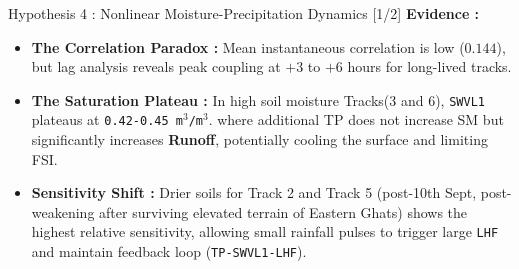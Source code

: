 \begin{frame}{Hypothesis 4 : Nonlinear Moisture-Precipitation Dynamics [1/2]}
	\vspace{0.2cm}
	\footnotesize
	\textbf{Evidence :}
	\begin{itemize}
		\item \textbf{The Correlation Paradox :} Mean instantaneous correlation is low ($0.144$), but lag analysis reveals peak coupling at $+3$ to $+6$ hours for long-lived tracks.
		\item \textbf{The Saturation Plateau :} In high soil moisture Tracks(3 and 6), \texttt{SWVL1} plateaus at \texttt{0.42-0.45 m$^3$/m$^3$}. where additional TP does not increase SM but significantly increases \textbf{Runoff}, potentially cooling the surface and limiting FSI. \cite{clapp1978empirical}
		\item \textbf{Sensitivity Shift :} Drier soils for Track 2 and Track 5 (post-10th Sept, post-weakening after surviving elevated terrain of Eastern Ghats) shows the highest relative sensitivity, allowing small rainfall pulses to trigger large \texttt{LHF} and maintain feedback loop (\texttt{TP-SWVL1-LHF}). \cite{hunt2017effect}
	\end{itemize}
\end{frame}

